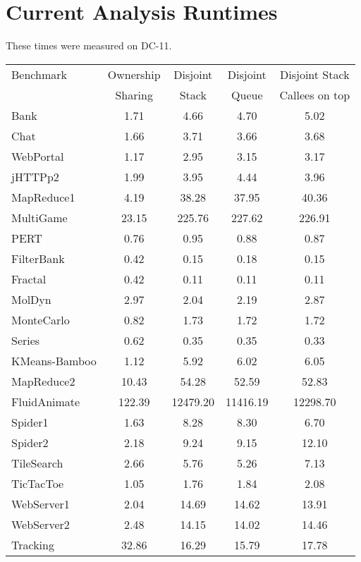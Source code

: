 \documentclass{amsart}[9pt]
\begin{document}
\newpage

\section{Current Analysis Runtimes}
These times were measured on DC-11.

\begin{tabular}{|l|c|c|c|c|}
\hline
Benchmark     & Ownership & Disjoint & Disjoint & Disjoint Stack \\
              & Sharing   & Stack    & Queue    & Callees on top \\
\hline
Bank          &  1.71   & 4.66     & 4.70     &  5.02           \\
Chat          &  1.66   & 3.71     & 3.66     &  3.68           \\
WebPortal     &  1.17   & 2.95     & 3.15     &  3.17           \\
jHTTPp2       &  1.99   & 3.95     & 4.44     &  3.96           \\
MapReduce1    &  4.19   & 38.28    & 37.95    &  40.36          \\
MultiGame     &  23.15  & 225.76   & 227.62   &  226.91         \\
PERT          &  0.76   & 0.95     & 0.88     &  0.87           \\
FilterBank    &  0.42   & 0.15     & 0.18     &  0.15           \\
Fractal       &  0.42   & 0.11     & 0.11     &  0.11           \\
MolDyn        &  2.97   & 2.04     & 2.19     &  2.87           \\
MonteCarlo    &  0.82   & 1.73     & 1.72     &  1.72           \\
Series        &  0.62   & 0.35     & 0.35     &  0.33           \\
KMeans-Bamboo &  1.12   & 5.92     & 6.02     &  6.05           \\
MapReduce2    &  10.43  & 54.28    & 52.59    &  52.83          \\
FluidAnimate  &  122.39 & 12479.20 & 11416.19 &  12298.70       \\
Spider1       &  1.63   & 8.28     & 8.30     &  6.70           \\
Spider2       &  2.18   & 9.24     & 9.15     &  12.10          \\
TileSearch    &  2.66   & 5.76     & 5.26     &  7.13           \\
TicTacToe     &  1.05   & 1.76     & 1.84     &  2.08           \\
WebServer1    &  2.04   & 14.69    & 14.62    &  13.91          \\
WebServer2    &  2.48   & 14.15    & 14.02    &  14.46          \\
Tracking      &  32.86  & 16.29    & 15.79    &  17.78          \\
\hline
\end{tabular}
\end{document}

